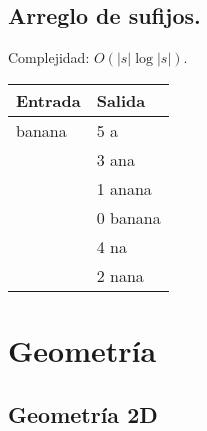 \documentclass[10pt, letterpaper, twoside]{article}
\begin{document}
\subsection{Arreglo de sufijos.}

Complejidad: $O(|s|\log |s|)$.



\begin{tabular}{|p{7cm}|p{7cm}|}
\hline
\textbf{Entrada} & \textbf{Salida}\\ \hline
banana & 5 a\\
& 3 ana\\
& 1 anana\\
& 0 banana\\
& 4 na\\
& 2 nana\\ \hline
\end{tabular}


\section{Geometría}

\subsection{Geometría 2D}


\end{document}
